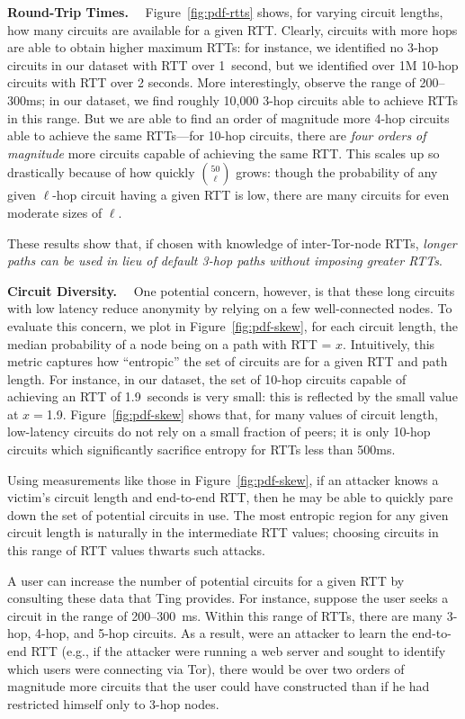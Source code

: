 \noindent
%
\textbf{Round-Trip Times.}~~
%
Figure~\ref{fig:pdf-rtts} shows, for varying circuit lengths, how many
circuits are available for a given RTT\@.
%
Clearly, circuits with more hops are able to obtain higher maximum
RTTs: for instance, we identified no 3-hop circuits in our dataset with
RTT over 1~second, but we identified over 1M 10-hop circuits with RTT over
2 seconds.
%
More interestingly, observe the range of 200--300ms; in our dataset,
we find roughly 10,000 3-hop circuits able to achieve RTTs in this
range.
%
But we are able to find an order of magnitude more 4-hop circuits able
to achieve the same RTTs---for 10-hop circuits, there are \emph{four
orders of magnitude} more circuits capable of achieving the same RTT\@.
%
This scales up so drastically because of how quickly $50 \choose \ell$
grows: though the probability of any given $\ell$-hop circuit having a
given RTT is low, there are many circuits for even moderate sizes of
$\ell$.


These results show that, if chosen with knowledge of inter-Tor-node
RTTs, \emph{longer paths can be used in lieu of default 3-hop paths
without imposing greater RTTs}.


\medskip

\noindent
%
\textbf{Circuit Diversity.}~~
%
One potential concern, however, is that these long circuits with low
latency reduce anonymity by relying on a few well-connected nodes.
%
To evaluate this concern, we plot in Figure~\ref{fig:pdf-skew}, for
each circuit length, the median probability of a node being on a path
with RTT = $x$.
%
Intuitively, this metric captures how ``entropic'' the set of circuits
are for a given RTT and path length.
%
For instance, in our dataset, the set of 10-hop circuits capable of
achieving an RTT of 1.9~seconds is very small: this is reflected by the
small value at $x=$1.9.
%
Figure~\ref{fig:pdf-skew} shows that, for many values of circuit
length, low-latency circuits do not rely on a small fraction of peers;
it is only 10-hop circuits which significantly sacrifice entropy for
RTTs less than 500ms.


Using measurements like those in Figure~\ref{fig:pdf-skew}, if an
attacker knows a victim's circuit length and end-to-end RTT, then he
may be able to quickly pare down the set of potential circuits in use.
%
The most entropic region for any given circuit length is naturally in
the intermediate RTT values; choosing circuits in this range of RTT
values thwarts such attacks.


A user can increase the number of potential circuits for a given RTT by
consulting these data that Ting provides.
%
For instance, suppose the user seeks a circuit in the range of
200--300~ms.
%
Within this range of RTTs, there are many 3-hop,
4-hop, and 5-hop circuits. %
%
As a result, were an attacker to learn the end-to-end RTT (e.g.,
if the attacker were running a web server and sought to identify which
users were connecting via Tor), there would be over two orders of
magnitude more circuits that the user could have constructed than if he
had restricted himself only to 3-hop nodes.



